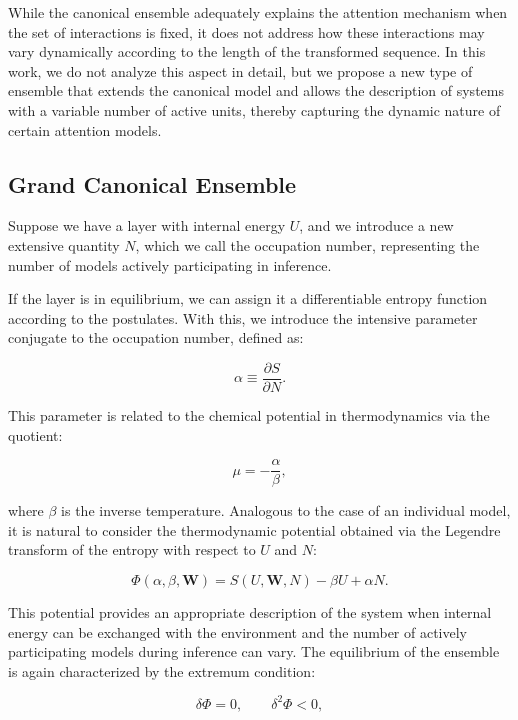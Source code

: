 \documentclass[12pt]{article}
\begin{document}
While the canonical ensemble adequately explains the attention mechanism when the set of interactions is fixed, it does not address how these interactions may vary dynamically according to the length of the transformed sequence. In this work, we do not analyze this aspect in detail, but we propose a new type of ensemble that extends the canonical model and allows the description of systems with a variable number of active units, thereby capturing the dynamic nature of certain attention models.
\subsection*{Grand Canonical Ensemble}

Suppose we have a layer with internal energy $U$, and we introduce a new extensive quantity $N$, which we call the occupation number, representing the number of models actively participating in inference.

If the layer is in equilibrium, we can assign it a differentiable entropy function according to the postulates. With this, we introduce the intensive parameter conjugate to the occupation number, defined as:

\begin{equation}
\alpha \equiv \frac{\partial S}{\partial N}.
\end{equation}

This parameter is related to the chemical potential in thermodynamics via the quotient:

\begin{equation}
\mu = -\frac{\alpha}{\beta},
\end{equation}

where $\beta$ is the inverse temperature. Analogous to the case of an individual model, it is natural to consider the thermodynamic potential obtained via the Legendre transform of the entropy with respect to $U$ and $N$:

\begin{equation}
\Phi(\alpha, \beta, \mathbf{W}) = S(U, \mathbf{W}, N) - \beta U + \alpha N.
\end{equation}

This potential provides an appropriate description of the system when internal energy can be exchanged with the environment and the number of actively participating models during inference can vary. The equilibrium of the ensemble is again characterized by the extremum condition:

\begin{equation}
\delta \Phi = 0, \qquad \delta^2 \Phi < 0,
\end{equation}
\end{document}
